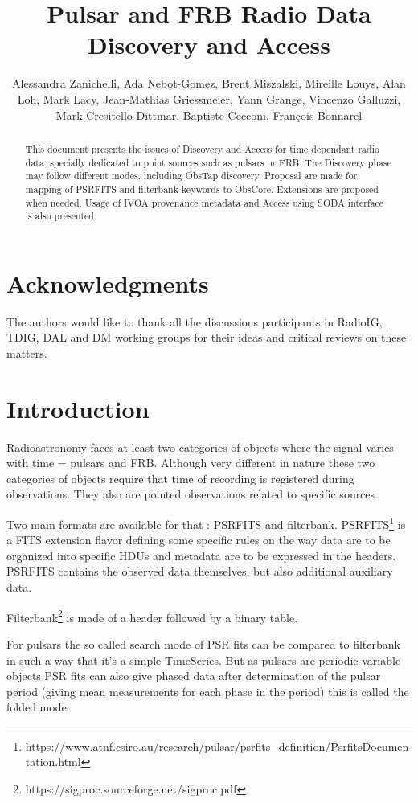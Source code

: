 \documentclass[11pt,a4paper]{ivoa}
\title{Pulsar and FRB Radio Data Discovery and Access}
\author{Alessandra Zanichelli, Ada Nebot-Gomez, Brent Miszalski, Mireille Louys, Alan Loh, Mark Lacy, Jean-Mathias Griessmeier, Yann Grange, Vincenzo Galluzzi, Mark Cresitello-Dittmar, Baptiste Cecconi,  Fran\c cois Bonnarel}
\begin{document}
\begin{abstract}
This document presents the issues of  Discovery and Access for time dependant radio data, specially dedicated to point sources such as pulsars or FRB. The Discovery phase may follow  different modes, including ObsTap discovery. Proposal are made for mapping of PSRFITS and filterbank keywords to ObsCore. Extensions are proposed when needed. Usage of IVOA provenance metadata and Access using SODA interface is also presented.   


\end{abstract}

\section*{Acknowledgments}
The authors would like to thank all the discussions participants in RadioIG, TDIG, DAL and DM working groups for their ideas and critical reviews on these matters. 
\section{Introduction}

         Radioastronomy faces at least two categories of objects where the signal varies with time = pulsars and FRB.      
      Although very different in nature these two categories of objects require that time of recording is registered during observations. They also are pointed observations related to specific sources.
      
      Two main formats are available for that : PSRFITS and filterbank. PSRFITS\footnote{https://www.atnf.csiro.au/research/pulsar/psrfits\_definition/PsrfitsDocumentation.html} is a FITS extension flavor defining some specific rules on the way data are to be organized into specific HDUs and metadata are to be expressed in the headers.   PSRFITS contains the observed data themselves,  but also additional auxiliary data.
      
      
       Filterbank\footnote{https://sigproc.sourceforge.net/sigproc.pdf} is made of a header followed by a binary table. 
       
      
       
       For pulsars the so called search mode of PSR fits can be compared to filterbank in such a way that it's a simple TimeSeries. 
       But as pulsars are periodic variable objects PSR fits can also give phased data  after determination of the pulsar period (giving mean measurements for each phase in the period) this is called the folded mode. 
\end{document}
